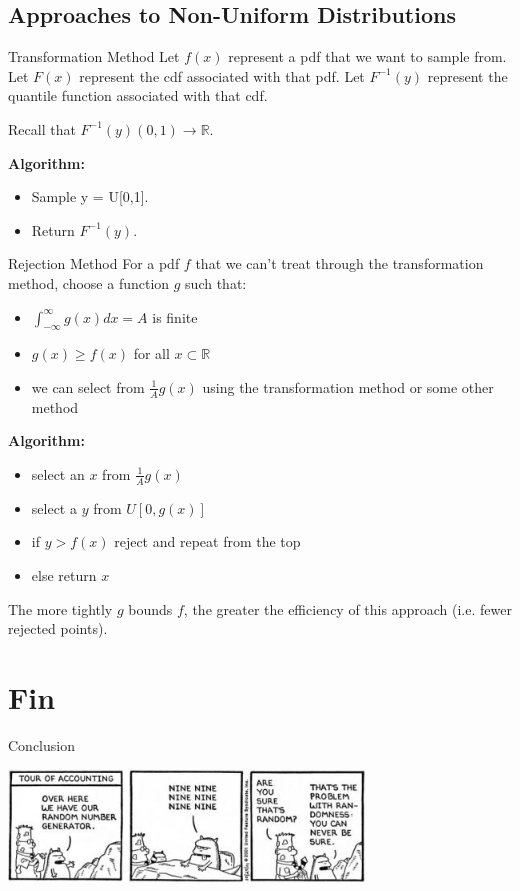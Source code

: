 \documentclass{beamer}
\begin{document}
\subsection{Approaches to Non-Uniform Distributions}

\begin{frame}{Transformation Method}
Let $f(x)$ represent a pdf that we want to sample from.
Let $F(x)$ represent the cdf associated with that pdf.
Let $F^{-1}(y)$ represent the quantile function associated with that cdf.

Recall that $F^{-1}(y) (0,1) \rightarrow \mathbb{R}$.

\textbf{Algorithm:}
\begin{itemize}
\item Sample y = U[0,1].
\item Return $F^{-1}(y)$.
\end{itemize}

\end{frame}

\begin{frame}{Rejection Method}
For a pdf $f$ that we can't treat through the transformation method, choose a function $g$ such that:
\begin{itemize}
\item $\int_{-\infty}^{\infty}g(x)dx = A$ is finite
\item $g(x) \geq f(x)$ for all $x \subset \mathbb{R}$
\item we can select from $\frac{1}{A} g(x)$ using the transformation method or some other method
\end{itemize}
\pause \textbf{Algorithm:}
\begin{itemize}
\item select an $x$ from $\frac{1}{A}g(x)$
\item select a $y$ from $U[0,g(x)]$
\item if $y > f(x)$ reject and repeat from the top
\item else return $x$
\end{itemize}
The more tightly $g$ bounds $f$, the greater the efficiency of this approach (i.e. fewer rejected points).

\end{frame}

\section{Fin}
\begin{frame}{Conclusion}
\begin{centering}
\includegraphics[height=3cm]{dilbert_cartoon.jpg} \\
\end{centering}
\end{frame}
\end{document}

